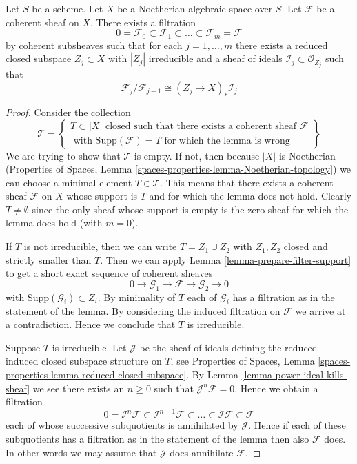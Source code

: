 \begin{lemma}
\label{lemma-coherent-filter}
Let $S$ be a scheme. Let $X$ be a Noetherian algebraic space over $S$.
Let $\mathcal{F}$ be a coherent sheaf on $X$. There exists a filtration
$$
0 = \mathcal{F}_0 \subset \mathcal{F}_1 \subset
\ldots \subset \mathcal{F}_m = \mathcal{F}
$$
by coherent subsheaves such that for each $j = 1, \ldots, m$
there exists a reduced closed subspace $Z_j \subset X$ with $|Z_j|$
irreducible and a sheaf of ideals $\mathcal{I}_j \subset \mathcal{O}_{Z_j}$
such that
$$
\mathcal{F}_j/\mathcal{F}_{j - 1}
\cong (Z_j \to X)_* \mathcal{I}_j
$$
\end{lemma}

\begin{proof}
Consider the collection
$$
\mathcal{T} =
\left\{
\begin{matrix}
T \subset |X|
\text{ closed such that there exists a coherent sheaf }
\mathcal{F} \\
\text{ with }
\text{Supp}(\mathcal{F}) = T
\text{ for which the lemma is wrong}
\end{matrix}
\right\}
$$
We are trying to show that $\mathcal{T}$ is empty. If not, then
because $|X|$ is Noetherian (Properties of Spaces, Lemma
\ref{spaces-properties-lemma-Noetherian-topology})
we can choose a minimal element $T \in \mathcal{T}$. This means that
there exists a coherent sheaf $\mathcal{F}$ on $X$ whose support is $T$
and for which the lemma does not hold. Clearly $T \not = \emptyset$ since
the only sheaf whose support is empty is the zero sheaf for which the
lemma does hold (with $m = 0$).

\medskip\noindent
If $T$ is not irreducible, then we can write $T = Z_1 \cup Z_2$
with $Z_1, Z_2$ closed and strictly smaller than $T$.
Then we can apply Lemma \ref{lemma-prepare-filter-support}
to get a short exact sequence of coherent sheaves
$$
0 \to
\mathcal{G}_1 \to
\mathcal{F} \to
\mathcal{G}_2 \to 0
$$
with $\text{Supp}(\mathcal{G}_i) \subset Z_i$. By minimality of
$T$ each of $\mathcal{G}_i$ has a filtration as in the statement
of the lemma. By considering the induced filtration on $\mathcal{F}$
we arrive at a contradiction. Hence we conclude
that $T$ is irreducible.

\medskip\noindent
Suppose $T$ is irreducible. Let $\mathcal{J}$ be the sheaf of ideals
defining the reduced induced closed subspace structure on $T$,
see Properties of Spaces, Lemma
\ref{spaces-properties-lemma-reduced-closed-subspace}.
By Lemma \ref{lemma-power-ideal-kills-sheaf} we see there exists
an $n \geq 0$ such that $\mathcal{J}^n\mathcal{F} = 0$. Hence we obtain
a filtration
$$
0 = \mathcal{I}^n\mathcal{F} \subset \mathcal{I}^{n - 1}\mathcal{F}
\subset \ldots \subset \mathcal{I}\mathcal{F} \subset \mathcal{F}
$$
each of whose successive subquotients is annihilated by $\mathcal{J}$.
Hence if each of these subquotients has a filtration as in the statement
of the lemma then also $\mathcal{F}$ does. In other words we may
assume that $\mathcal{J}$ does annihilate $\mathcal{F}$.


\end{proof}
